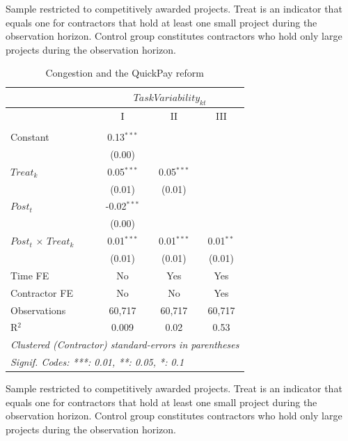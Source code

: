 \documentclass[
]{article}
\begin{document}
\begin{table}[htbp]
   \par \raggedright 
   Sample restricted to competitively awarded projects. Treat is an indicator that equals one for contractors that hold at least one small project during the observation horizon. Control group constitutes contractors who hold only large projects during the observation horizon.
\end{table}
\begin{table}[htbp]
   \caption{Congestion and the QuickPay reform}
   \centering
   \tiny
   \begin{tabular}{lccc}
      \toprule
      \midrule  & \multicolumn{3}{c}{$TaskVariability_{kt}$}\\
      \midrule  & I & II & III\\
      \midrule \\
      Constant                     & 0.13$^{***}$  &              &   \\   
                                   & (0.00)        &              &   \\   
      $Treat_k$                    & 0.05$^{***}$  & 0.05$^{***}$ &   \\   
                                   & (0.01)        & (0.01)       &   \\   
      $Post_t$                     & -0.02$^{***}$ &              &   \\   
                                   & (0.00)        &              &   \\   
      $Post_t$ $\times$ $Treat_k$  & 0.01$^{***}$  & 0.01$^{***}$ & 0.01$^{**}$\\   
                                   & (0.01)        & (0.01)       & (0.01)\\   
      \midrule 
      Time FE                      & No            & Yes          & Yes\\  
      Contractor FE                & No            & No           & Yes\\  
      Observations                 & 60,717        & 60,717       & 60,717\\  
      R$^2$                        & 0.009         & 0.02         & 0.53\\  
      \midrule
      \multicolumn{4}{l}{\emph{Clustered (Contractor) standard-errors in parentheses}}\\
      \multicolumn{4}{l}{\emph{Signif. Codes: ***: 0.01, **: 0.05, *: 0.1}}\\
   \end{tabular}
   
   \par \raggedright 
   Sample restricted to competitively awarded projects. Treat is an indicator that equals one for contractors that hold at least one small project during the observation horizon. Control group constitutes contractors who hold only large projects during the observation horizon.
\end{table}
\end{document}
